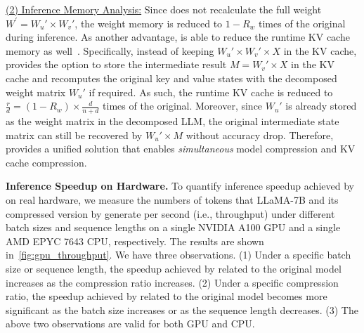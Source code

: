 \underline{(2) Inference Memory Analysis:} 
%
Since \sysname does not recalculate the full weight $W^{\prime}=W_u' \times W_v'$, the weight memory is reduced to $1 - R_w$ times of the original during inference.
%
As another advantage, \sysname is able to reduce the runtime KV cache memory as well~\citep{DBLP:journals/corr/abs-2406-13035, wan2025meda,DBLP:journals/corr/abs-2409-09808}. Specifically, instead of keeping {\small$W_u' \times W_v' \times X$} in the KV cache, \sysname provides the option to store the intermediate result {\small$M=W_v' \times X$} in the KV cache and recomputes the original key and value states with the decomposed weight matrix {\small$W_u'$} if required. As such, the runtime KV cache is reduced to {\small$\frac{r}{d}= (1 - R_w)\times \frac{d}{n+d}$} times of the original. Moreover, since {\small$W_u'$} is already stored as the weight matrix in the decomposed LLM, the original intermediate state matrix can still be recovered by {\small$W_u'\times M$} without accuracy drop. Therefore, \sysname provides a unified solution that enables \textit{simultaneous} model compression and KV cache compression.


\textbf{Inference Speedup on Hardware.} 
%
To quantify inference speedup achieved by \sysname on real hardware, we measure the numbers of tokens that LLaMA-7B and its compressed version by \sysname generate per second (i.e., throughput) under different batch sizes and sequence lengths on a single NVIDIA A100 GPU and a single AMD EPYC 7643 CPU, respectively. 
%
The results are shown in~\cref{fig:gpu_throughput}. We have three observations. 
%
(1) Under a specific batch size or sequence length, the speedup achieved by \sysname related to the original model increases as the compression ratio increases.
%
(2) Under a specific compression ratio, the speedup  achieved by \sysname related to the original model becomes more significant as the batch size increases or as the sequence length decreases.
%
(3) The above two observations are valid for both GPU and CPU.



